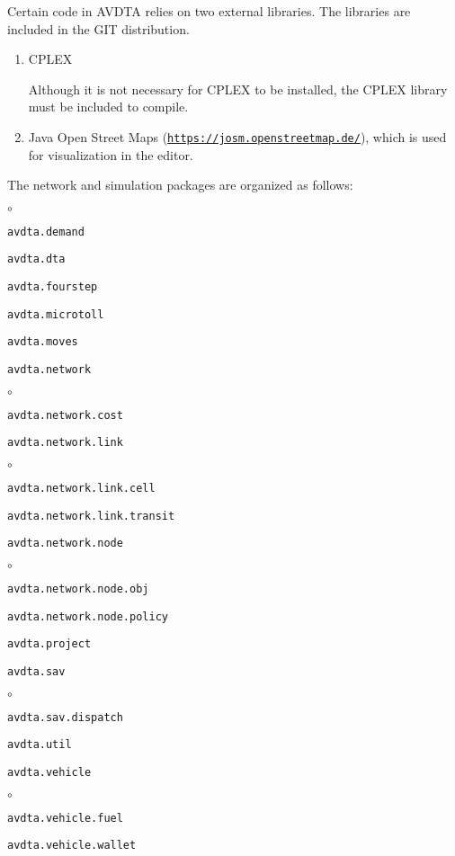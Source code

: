 Certain code in AVDTA relies on two external libraries. The libraries are included in the GIT distribution.
\begin{enumerate}
	\item CPLEX
	
	Although it is not necessary for CPLEX to be installed, the CPLEX library must be included to compile.
	
	\item Java Open Street Maps (\href{https://josm.openstreetmap.de/}{\texttt{https://josm.openstreetmap.de/}}), which is used for visualization in the editor.
\end{enumerate}
The network and simulation packages are organized as follows:
\begin{list}{$\circ$}{}
	\item \texttt{avdta.demand}
	\item \texttt{avdta.dta}
	\item \texttt{avdta.fourstep}
	\item \texttt{avdta.microtoll}
	
	\item \texttt{avdta.moves}
	
	\item \texttt{avdta.network}
	
	\begin{list}{$\circ$}{}
		\item \texttt{avdta.network.cost}
		\item \texttt{avdta.network.link}
		
		\begin{list}{$\circ$}{}
			\item \texttt{avdta.network.link.cell}
			\item \texttt{avdta.network.link.transit}
		\end{list}
		
		\item \texttt{avdta.network.node}
		\begin{list}{$\circ$}{}
			\item \texttt{avdta.network.node.obj}
			\item \texttt{avdta.network.node.policy}
		\end{list}
	\end{list}
	
	\item \texttt{avdta.project}
	
	\item \texttt{avdta.sav}
	
	\begin{list}{$\circ$}{}
		\item \texttt{avdta.sav.dispatch}
	\end{list}
	
	\item \texttt{avdta.util}
	\item \texttt{avdta.vehicle}
	
	\begin{list}{$\circ$}{}
		\item \texttt{avdta.vehicle.fuel}
		\item \texttt{avdta.vehicle.wallet}
	\end{list}
\end{list}










